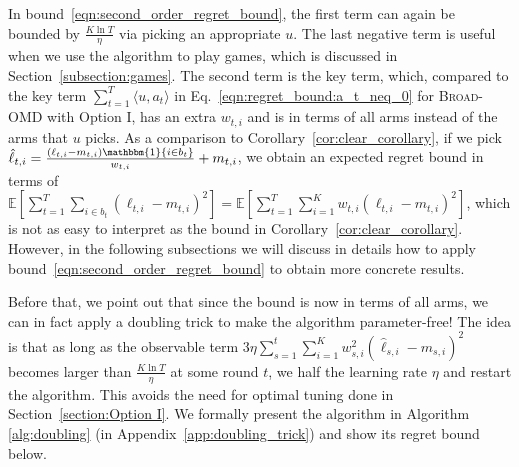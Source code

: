 \documentclass[final, 12pt]{colt2018} %
\newcommand{\p}{\prime}
\newcommand{\inn}[1]{ \langle {#1} \rangle }
\begin{document}
In bound~\eqref{eqn:second_order_regret_bound}, 
the first term can again be bounded by $\frac{K \ln T}{\eta}$ via picking an appropriate $u$.
The last negative term is useful when we use the algorithm to play games, which is discussed in Section~\ref{subsection:games}.
The second term is the key term, which, compared to the key term $\sum_{t=1}^T \inn{u,a_t}$ in Eq.~\eqref{eqn:regret_bound:a_t_neq_0} for \textsc{Broad-OMD} with Option I,
has an extra $w_{t,i}$ and is in terms of all arms instead of the arms that $u$ picks.
As a comparison to Corollary~\ref{cor:clear_corollary}, if we pick $\hat{\ell}_{t,i}=\frac{(\ell_{t,i}-m_{t,i})\mathbbm{1}\{i\in b_t\}}{w_{t,i}}+m_{t,i}$,
we obtain an expected regret bound in terms of $\mathbb{E}\left[ \sum_{t=1}^T \sum_{i \in b_t} (\ell_{t,i} - m_{t,i})^2 \right] = 
\mathbb{E}\left[ \sum_{t=1}^T \sum_{i =1}^K w_{t,i} (\ell_{t,i} - m_{t,i})^2 \right]$,
which is not as easy to interpret as the bound in Corollary~\ref{cor:clear_corollary}.
However, in the following subsections we will discuss in details how to apply bound~\eqref{eqn:second_order_regret_bound} to obtain more concrete results.


Before that, we point out that since the bound is now in terms of all arms, %
we can in fact apply a doubling trick to make the algorithm parameter-free!
The idea is that 
as long as the observable term $3\eta\sum_{s=1}^t \sum_{i=1}^K w_{s,i}^2(\hat{\ell}_{s,i}-m_{s,i})^2$ becomes larger than $\frac{K\ln T}{\eta}$ at some round $t$, 
we half the learning rate $\eta$ and restart the algorithm. 
This avoids the need for optimal tuning done in Section~\ref{section:Option I}.
We formally present the algorithm in Algorithm \ref{alg:doubling} (in Appendix~\ref{app:doubling_trick}) and show its regret bound below.
\end{document}
